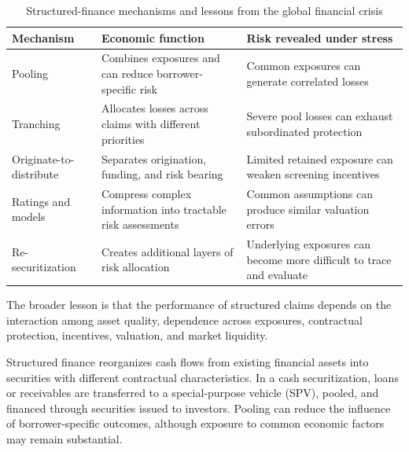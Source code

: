 \begin{table}[H]

\centering

\caption{Structured-finance mechanisms and lessons from the global financial crisis}

\label{tab:ch20-crisis-lessons}

\begin{tabularx}{\textwidth}{@{}p{3.5cm}YY@{}}

\toprule
\textbf{Mechanism} &
\textbf{Economic function} &
\textbf{Risk revealed under stress} \\
\midrule

Pooling &
Combines exposures and can reduce borrower-specific risk &
Common exposures can generate correlated losses \\

Tranching &
Allocates losses across claims with different priorities &
Severe pool losses can exhaust subordinated protection \\

Originate-to-distribute &
Separates origination, funding, and risk bearing &
Limited retained exposure can weaken screening incentives \\

Ratings and models &
Compress complex information into tractable risk assessments &
Common assumptions can produce similar valuation errors \\

Re-securitization &
Creates additional layers of risk allocation &
Underlying exposures can become more difficult to trace and evaluate \\

\bottomrule

\end{tabularx}

\end{table}

The broader lesson is that the performance of structured claims depends on the interaction among asset quality, dependence across exposures, contractual protection, incentives, valuation, and market liquidity.




Structured finance reorganizes cash flows from existing financial assets into securities with different contractual characteristics. In a cash securitization, loans or receivables are transferred to a special-purpose vehicle (SPV), pooled, and financed through securities issued to investors. Pooling can reduce the influence of borrower-specific outcomes, although exposure to common economic factors may remain substantial.

